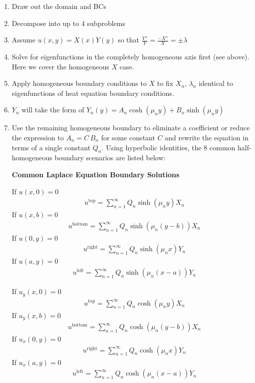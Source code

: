\documentclass[11pt, fleqn]{article}
\begin{document}
\begin{enumerate}
    \item Draw out the domain and BCs
    \item Decompose into up to 4 subproblems
    \item Assume $u(x,y)=X(x)Y(y)$ so that $\frac{Y''}{Y}=\frac{-X''}{X}=\pm\lambda$
    \item Solve for eigenfunctions in the completely homogeneous axis first (see above). Here we cover the homogeneous $X$ case.
    \item Apply homogeneous boundary conditions to $X$ to fix $X_n$, $\lambda_n$ identical to eigenfunctions of heat equation boundary conditions.
    \item $Y_n$ will take the form of $Y_n(y) = A_n\cosh(\mu_n y)+B_n\sinh(\mu_ny)$
    \item Use the remaining homogeneous boundary to eliminate a coefficient or reduce the expression to $A_n=C \, B_n$ for some constant $C$ and rewrite the equation in terms of a single constant $Q_n$.  Using hyperbolic identities, the 8 common half-homogeneous boundary scenarios are listed below: 

\begin{tcolorbox}
\begin{center}
    \textbf{Common Laplace Equation Boundary Solutions}
\end{center}
\begin{multicols}{2}
If $u(x,0)=0$
\begin{align*}
    &u^{\text{top}}=\sum_{n=1}^\infty Q_n\sinh(\mu_n y)X_n
\end{align*}
If $u(x,b)=0$
\begin{align*}
    &u^{\text{bottom}}=\sum_{n=1}^\infty Q_n\sinh(\mu_n(y-b))X_n
\end{align*}
If $u(0,y)=0$
\begin{align*}
    &u^{\text{right}}=\sum_{n=1}^\infty Q_n\sinh(\mu_nx)Y_n
\end{align*}
If $u(a,y)=0$
\begin{align*}
    &u^{\text{left}}=\sum_{n=1}^\infty Q_n\sinh(\mu_n(x-a))Y_n
\end{align*}


If $u_y(x,0)=0$
\begin{align*}
    &u^{\text{top}}=\sum_{n=1}^\infty Q_n\cosh(\mu_n y)X_n
\end{align*}
If $u_y(x,b)=0$
\begin{align*}
    &u^{\text{bottom}}=\sum_{n=1}^\infty Q_n\cosh(\mu_n(y-b))X_n
\end{align*}
If $u_x(0,y)=0$
\begin{align*}
    &u^{\text{right}}=\sum_{n=1}^\infty Q_n\cosh(\mu_nx)Y_n
\end{align*}
If $u_x(a,y)=0$
\begin{align*}
    &u^{\text{left}}=\sum_{n=1}^\infty Q_n\cosh(\mu_n(x-a))Y_n
\end{align*}


\end{multicols}
\end{tcolorbox}
\end{enumerate}
\end{document}

